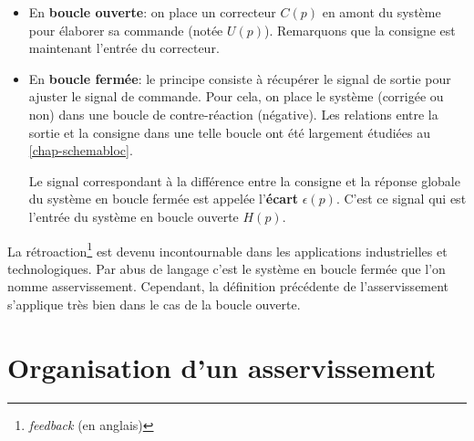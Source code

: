 \begin{itemize}
    \item En \textbf{boucle ouverte}: on place un correcteur $C(p)$
          en amont du système pour élaborer 
          sa commande (notée $U(p)$).
          Remarquons que la consigne est maintenant
          l'entrée du correcteur.
    \begin{center}
        
    \end{center}
    \item En \textbf{boucle fermée}: le principe consiste à récupérer 
          le signal de sortie pour ajuster le signal de commande. 
          Pour cela, on place le système (corrigée ou non) dans une 
          boucle de contre-réaction (négative). 
          Les relations entre la sortie et la consigne dans une telle 
          boucle ont été largement étudiées au \cref{chap-schemabloc}.
    \begin{center}
        
    \end{center}
          Le signal correspondant à la différence entre la consigne
          et la réponse globale du système en boucle fermée est
          appelée l'\textbf{écart} $\epsilon(p)$. C'est ce signal qui est
          l'entrée du système en boucle ouverte $H(p)$.
\end{itemize}
La rétroaction\footnote{\emph{feedback} (en anglais)} est devenu incontournable
dans les applications industrielles et technologiques. Par abus de langage 
c'est le système en boucle fermée que l'on nomme asservissement. Cependant, la 
définition précédente de l'asservissement s'applique très bien dans 
le cas de la boucle ouverte.
\section{Organisation d'un asservissement}
